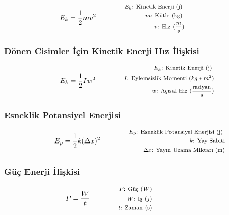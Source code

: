 \begin{equation}
    E_k = \frac{1}{2} m v^2 \qquad \qquad \parbox{4cm}{\footnotesize$\begin{aligned}
        E_k\text{: Kinetik  Enerji (j) } \\
        m\text{: Kütle (kg) } \\
        v\text{: Hız } (\frac{m}{s})
    \end{aligned}$}
\end{equation}

\subsubsection*{Dönen Cisimler İçin Kinetik Enerji Hız İlişkisi}

\begin{equation}
    E_k = \frac{1}{2} I w^2 \qquad \qquad \parbox{4cm}{\footnotesize$\begin{aligned}
        E_k\text{: Kinetik  Enerji (j) } \\
        I\text{: Eylemsizlik Momenti (} kg*m^2\text{)} \\
        w\text{: Açısal Hız } (\frac{\text{radyan}}{s})
    \end{aligned}$}
\end{equation}

\subsubsection*{Esneklik Potansiyel Enerjisi}
\begin{equation}
    E_p = \frac{1}{2}k(\Delta x)^2 \qquad \qquad \parbox{4cm}{\footnotesize$\begin{aligned}
        E_p\text{: Esneklik Potansiyel Enerjisi (j) } \\
        k\text{: Yay Sabiti} \\
        \Delta x\text{: Yayın Uzama Miktarı (m)}
\end{aligned}$}
\end{equation}

\subsubsection*{Güç Enerji İlişkisi}
\begin{equation}
    P = \frac{W}{t} \qquad \qquad \parbox{4cm}{\footnotesize$\begin{aligned}
        P\text{: Güç } (W) \\
        W\text{: İş } (j) \\
        t\text{: Zaman (s)}
\end{aligned}$}
\end{equation}
